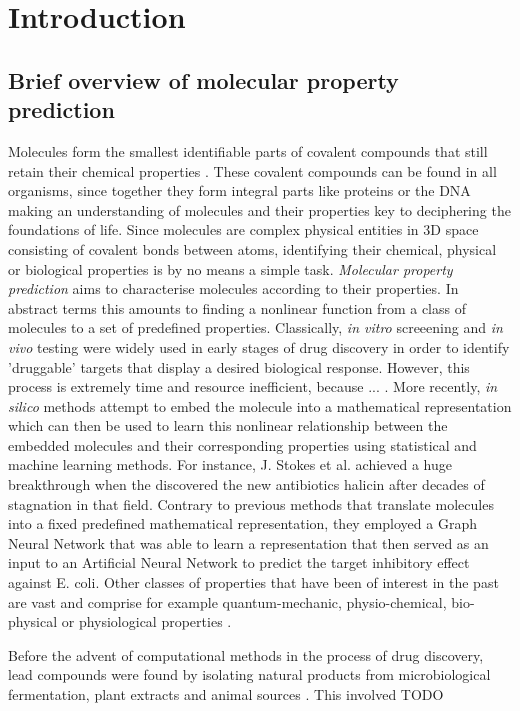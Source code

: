 \section{Introduction}\label{sec:introduction}
\subsection{Brief overview of molecular property prediction}
Molecules form the smallest identifiable parts of covalent compounds that still retain their chemical properties \cite{molecules}. These covalent compounds can be found in all organisms, since together they form integral parts like proteins or the DNA making an understanding of molecules and their properties key to deciphering the foundations of life. Since molecules are complex physical entities in 3D space consisting of covalent bonds between atoms, identifying their chemical, physical or biological properties is by no means a simple task. \emph{Molecular property prediction} aims to characterise molecules according to their properties. In abstract terms this amounts to finding a nonlinear function from a class of molecules to a set of predefined properties.  Classically, \emph{in vitro} screeening and \emph{in vivo} testing were widely used in early stages of drug discovery in order to identify 'druggable' targets that display a desired biological response. However, this process is extremely time and resource inefficient, because ... . More recently, \emph{in silico} methods attempt to embed the molecule into a mathematical representation which can then be used to learn this nonlinear relationship between the embedded molecules and their corresponding properties using statistical and machine learning methods. For instance, J. Stokes et al. achieved a huge breakthrough when the discovered the new antibiotics halicin \cite{STOKES2020688} after decades of stagnation in that field. Contrary to previous methods that translate molecules into a fixed predefined mathematical representation, they employed a Graph Neural Network that was able to learn a representation that then served as an input to an Artificial Neural Network to predict the target inhibitory effect against E. coli. %
Other classes of properties that have been of interest in the past are vast and comprise for example quantum-mechanic, physio-chemical, bio-physical or physiological properties \cite{wu2018moleculenet}. 



Before the advent of computational methods in the process of drug discovery, lead compounds were found by isolating natural products from microbiological fermentation, plant extracts and animal sources \cite{Gallop1994ApplicationsOC}. This involved TODO

